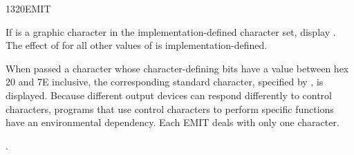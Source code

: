 \vspace*{-3ex}
\begin{worddef}{1320}{EMIT}
\item {}

	If  is a graphic character in the implementation-defined
	character set, display . The effect of  for all
	other values of  is implementation-defined.

	When passed a character whose character-defining bits have a
	value between hex 20 and 7E inclusive, the corresponding
	standard character, specified by , is displayed. Because different output
	devices can respond differently to control characters, programs
	that use control characters to perform specific functions have
	an environmental dependency. Each EMIT deals with only one
	character.

\see {}.


\end{worddef}
